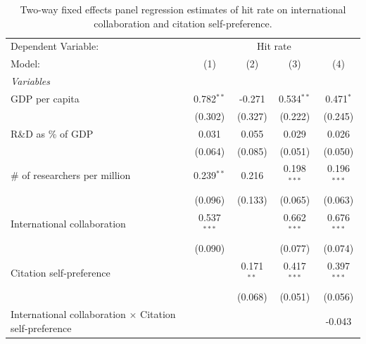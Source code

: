 
\begin{table}[H]
   \caption{\label{tab:H2_hitrate} Two-way fixed effects panel regression estimates of hit rate on international
   collaboration and citation self-preference.}
   \centering
   \scriptsize
   \renewcommand*{\arraystretch}{0.7}
   \begin{tabular}{lcccc}
      \tabularnewline \midrule \midrule
      Dependent Variable: & \multicolumn{4}{c}{Hit rate}\\
      Model:                                                         & (1)           & (2)          & (3)           & (4)\\  
      \midrule
      \emph{Variables}\\
      GDP per capita                                                 & 0.782$^{**}$  & -0.271       & 0.534$^{**}$  & 0.471$^{*}$\\   
                                                                     & (0.302)       & (0.327)      & (0.222)       & (0.245)\\   
      R\&D as \% of GDP                                              & 0.031         & 0.055        & 0.029         & 0.026\\   
                                                                     & (0.064)       & (0.085)      & (0.051)       & (0.050)\\   
      \# of researchers per million                                  & 0.239$^{**}$  & 0.216        & 0.198$^{***}$ & 0.196$^{***}$\\   
                                                                     & (0.096)       & (0.133)      & (0.065)       & (0.063)\\   
      International collaboration                                    & 0.537$^{***}$ &              & 0.662$^{***}$ & 0.676$^{***}$\\   
                                                                     & (0.090)       &              & (0.077)       & (0.074)\\   
      Citation self-preference                                       &               & 0.171$^{**}$ & 0.417$^{***}$ & 0.397$^{***}$\\   
                                                                     &               & (0.068)      & (0.051)       & (0.056)\\   
      International collaboration $\times$ Citation self-preference  &               &              &               & -0.043\\   

\end{tabular}
\end{table}

